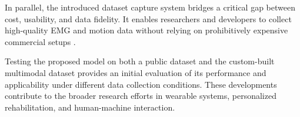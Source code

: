 In parallel, the introduced dataset capture system bridges a critical gap between cost, usability, and data fidelity. It enables researchers and developers to collect high-quality EMG and motion data without relying on prohibitively expensive commercial setups \cite{quivira2018translating}.

Testing the proposed model on both a public dataset and the custom-built multimodal dataset provides an initial evaluation of its performance and applicability under different data collection conditions. These developments contribute to the broader research efforts in wearable systems, personalized rehabilitation, and human-machine interaction.
